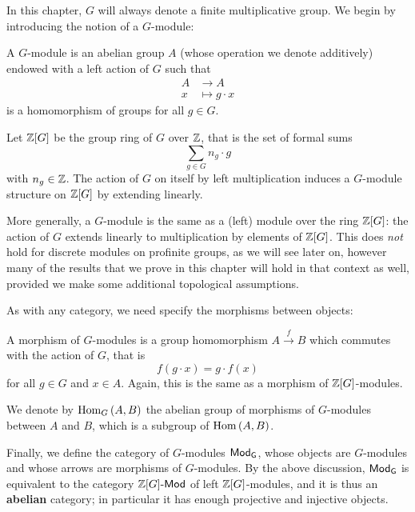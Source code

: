 \documentclass[a4paper, oneside]{memoir}
\begin{document}
In this chapter, $G$ will always denote a finite multiplicative group. We begin by introducing the notion of a $G$-module:

\begin{definition}
    A $G$-module is an abelian group $A$ (whose operation we denote additively) endowed with a left action of $G$ such that
    \begin{align*}
        A & \longrightarrow A    \\
        x & \longmapsto g\cdot x
    \end{align*}
    is a homomorphism of groups for all $g\in G$.
\end{definition}

\begin{remark}
    Let $\mathbb{Z}[G]$ be the group ring of $G$ over $\mathbb{Z}$, that is the set of formal sums
    \[
        \sum_{g\in G}{n_g\cdot g}
    \]
    with $n_g\in\mathbb{Z}$. The action of $G$ on itself by left multiplication induces a $G$-module structure on $\mathbb{Z}[G]$ by extending linearly.

    More generally, a $G$-module is the same as a (left) module over the ring $\mathbb{Z}[G]$: the action of $G$ extends linearly to multiplication by elements of $\mathbb{Z}[G]$. This does \textit{not} hold for discrete modules on profinite groups, as we will see later on, however many of the results that we prove in this chapter will hold in that context as well, provided we make some additional topological assumptions.
\end{remark}

As with any category, we need specify the morphisms between objects:

\begin{definition}
    A morphism of $G$-modules is a group homomorphism $A\overset{f}{\to} B$ which commutes with the action of $G$, that is
    \[
        f(g\cdot x)=g\cdot f(x)
    \]
    for all $g\in G$ and $x\in A$. Again, this is the same as a morphism of $\mathbb{Z}[G]$-modules.
\end{definition}

\noindent We denote by $\operatorname{Hom}_G{(A,B)}$ the abelian group of morphisms of $G$-modules between $A$ and $B$, which is a subgroup of $\operatorname{Hom}{(A,B)}$.

\medskip Finally, we define the category of $G$-modules $\mathsf{Mod}_\mathsf{G}$, whose objects are $G$-modules and whose arrows are morphisms of $G$-modules. By the above discussion, $\mathsf{Mod}_\mathsf{G}$ is equivalent to the category $\mathbb{Z}[G]\text{-}\mathsf{Mod}$ of left $\mathbb{Z}[G]$-modules, and it is thus an \textbf{abelian} category; in particular it has enough projective and injective objects.
\end{document}
